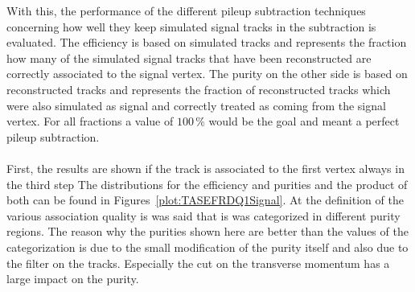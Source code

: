 \clearpage{}

With this, the performance of the different pileup subtraction techniques concerning how well they keep simulated signal tracks in the subtraction is evaluated. The efficiency is based on simulated tracks and represents the fraction how many of the simulated signal tracks that have been reconstructed are correctly associated to the signal vertex. The purity on the other side is based on reconstructed tracks and represents the fraction of reconstructed tracks which were also simulated as signal and correctly treated as coming from the signal vertex. For all fractions a value of $100\,\%$ would be the goal and meant a perfect pileup subtraction. \\ \\
First, the results are shown if the track is associated to the first vertex always in the third step The distributions for the efficiency and purities and the product of both can be found in Figures~\ref{plot:TASEFRDQ1Signal}. At the definition of the various association quality is was said that is was categorized in different purity regions. The reason why the purities shown here are better than the values of the categorization is due to the small modification of the purity itself and also due to the filter on the tracks. Especially the cut on the transverse momentum has a large impact on the purity.

